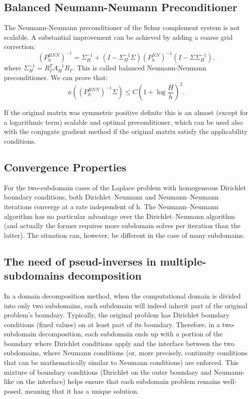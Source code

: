 \documentclass[11pt]{book}
\begin{document}
\subsection*{Balanced Neumann-Neumann Preconditioner}
The Neumann-Neumann preconditioner of the Schur complement system is not scalable. A substantial improvement can be achieved by adding a coarse grid correction:
$$
\left(P_{h}^{B N N}\right)^{-1}=\Sigma_{H}^{-1}+\left(I-\Sigma_{H}^{-1} \Sigma\right)\left(P_{h}^{N N}\right)^{-1}\left(I-\Sigma \Sigma_{H}^{-1}\right).
$$
where $\Sigma_{H}^{-1}=R_{\Gamma}^{T} A_{H}^{-1} R_{\Gamma}$. This is called balanced Neumann-Neumann preconditioner.
We can prove that:
$$
\kappa\left(\left(P_{h}^{B N N}\right)^{-1} \Sigma\right) \leq C\left(1+\log \frac{H}{h}\right)^{2}.
$$

If the original matrix was symmetric positive definite this is an almost (except for a  logarithmic term) scalable and optimal preconditioner, which can be used also with the conjugate gradient method if the original matrix satisfy the applicability conditions.


\subsection{Convergence Properties}

For the two-subdomain cases of the Laplace problem with homogeneous Dirichlet boundary conditions, both Dirichlet–Neumann and Neumann–Neumann iterations converge at a rate independent of h. The Neumann–Neumann algorithm has no particular advantage over the Dirichlet–Neumann algorithm (and actually the former requires more subdomain solves per iteration than the latter). The situation can, however, be different in the case of many subdomains.

\subsection*{The need of pseud-inverses in multiple-subdomains decomposition}

In a domain decomposition method, when the computational domain is divided into only two subdomains, each subdomain will indeed inherit part of the original problem's boundary. Typically, the original problem has Dirichlet boundary conditions (fixed values) on at least part of its boundary. Therefore, in a two-subdomain decomposition, each subdomain ends up with a portion of the boundary where Dirichlet conditions apply and the interface between the two subdomains, where Neumann conditions (or, more precisely, continuity conditions that can be mathematically similar to Neumann conditions) are enforced. This mixture of boundary conditions (Dirichlet on the outer boundary and Neumann-like on the interface) helps ensure that each subdomain problem remains well-posed, meaning that it has a unique solution.
\end{document}
